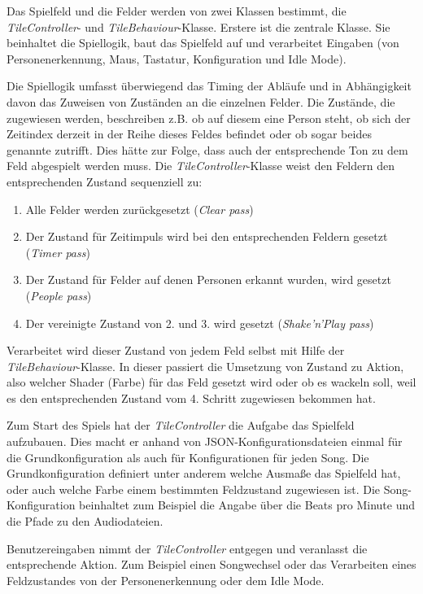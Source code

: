 \label{sec:tiles}

Das Spielfeld und die Felder werden von zwei Klassen bestimmt, die \emph{TileController}- und \emph{TileBehaviour}-Klasse. Erstere ist die zentrale Klasse. Sie beinhaltet die Spiellogik, baut das Spielfeld auf und verarbeitet Eingaben (von Personenerkennung, Maus, Tastatur, Konfiguration und Idle Mode).

Die Spiellogik umfasst überwiegend das Timing der Abläufe und in Abhängigkeit davon das Zuweisen von Zuständen an die einzelnen Felder. Die Zustände, die zugewiesen werden, beschreiben z.B. ob auf diesem eine Person steht, ob sich der Zeitindex derzeit in der Reihe dieses Feldes befindet oder ob sogar beides genannte zutrifft. Dies hätte zur Folge, dass auch der entsprechende Ton zu dem Feld abgespielt werden muss. Die \emph{TileController}-Klasse weist den Feldern den entsprechenden Zustand sequenziell zu:

\begin{enumerate}
\item Alle Felder werden zurückgesetzt (\emph{Clear pass})
\item Der Zustand für Zeitimpuls wird bei den entsprechenden Feldern gesetzt (\emph{Timer pass})
\item Der Zustand für Felder auf denen Personen erkannt wurden, wird gesetzt (\emph{People pass})
\item Der vereinigte Zustand von 2. und 3. wird gesetzt (\emph{Shake'n'Play pass})
\end{enumerate}

Verarbeitet wird dieser Zustand von jedem Feld selbst mit Hilfe der \emph{TileBehaviour}-Klasse. In dieser passiert die Umsetzung von Zustand zu Aktion, also welcher Shader (Farbe) für das Feld gesetzt wird oder ob es wackeln soll, weil es den entsprechenden Zustand vom 4. Schritt zugewiesen bekommen hat.

Zum Start des Spiels hat der \emph{TileController} die Aufgabe das Spielfeld aufzubauen. Dies macht er anhand von JSON-Konfigurationsdateien einmal für die Grundkonfiguration als auch für Konfigurationen für jeden Song. Die Grundkonfiguration definiert unter anderem welche Ausmaße das Spielfeld hat, oder auch welche Farbe einem bestimmten Feldzustand zugewiesen ist. Die Song-Konfiguration beinhaltet zum Beispiel die Angabe über die Beats pro Minute und die Pfade zu den Audiodateien.

Benutzereingaben nimmt der \emph{TileController} entgegen und veranlasst die entsprechende Aktion. Zum Beispiel einen Songwechsel oder das Verarbeiten eines Feldzustandes von der Personenerkennung oder dem Idle Mode.


